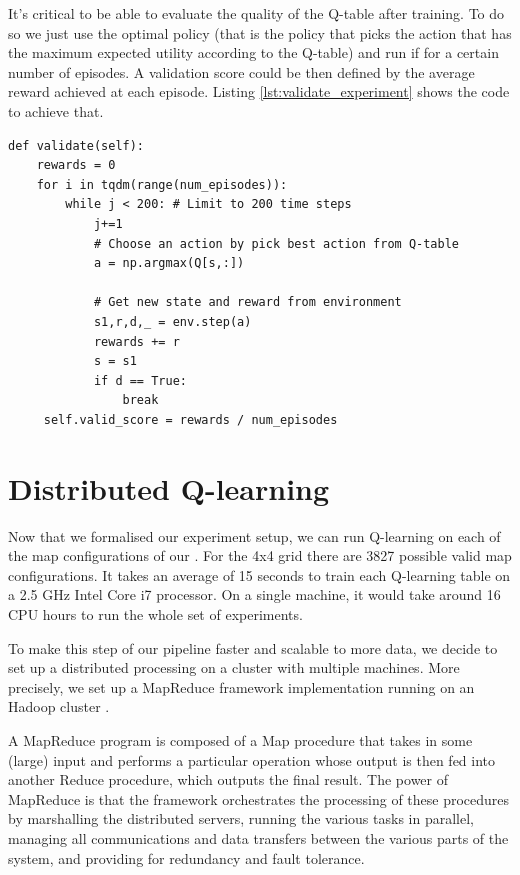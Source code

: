 It's critical to be able to evaluate the quality of the Q-table after training. To do so we just use the optimal policy (that is the policy that picks the action that has the maximum expected utility according to the Q-table) and run if for a certain number of episodes. A validation score could be then defined by the average reward achieved at each episode. Listing \ref{lst:validate_experiment} shows the code to achieve that.

\begin{minipage}{\linewidth}
\lstset{language=Python}
\lstset{frame=lines}
\lstset{basicstyle=\footnotesize}
\begin{lstlisting}
def validate(self):
	rewards = 0
    for i in tqdm(range(num_episodes)):
        while j < 200: # Limit to 200 time steps
            j+=1
            # Choose an action by pick best action from Q-table
            a = np.argmax(Q[s,:])
            
            # Get new state and reward from environment
            s1,r,d,_ = env.step(a)
            rewards += r
            s = s1
            if d == True:
                break
     self.valid_score = rewards / num_episodes
\end{lstlisting}
\end{minipage}


\section{Distributed Q-learning}
Now that we formalised our experiment setup, we can run Q-learning on each of the map configurations of our . For the 4x4 grid there are 3827 possible valid map configurations. It takes an average of 15 seconds to train each Q-learning table on a 2.5 GHz Intel Core i7 processor. On a single machine, it would take around 16 CPU hours to run the whole set of experiments.

To make this step of our pipeline faster and scalable to more data, we decide to set up a distributed processing on a cluster with multiple machines. More precisely, we set up a MapReduce framework \parencite{Dean:2004:MSD:1251254.1251264} implementation running on an Hadoop cluster \parencite{shvachko2010hadoop}.

A MapReduce program is composed of a Map procedure that takes in some (large) input and performs a particular operation whose output is then fed into another Reduce procedure, which outputs the final result. The power of MapReduce is that the framework orchestrates the processing of these procedures by marshalling the distributed servers, running the various tasks in parallel, managing all communications and data transfers between the various parts of the system, and providing for redundancy and fault tolerance.

